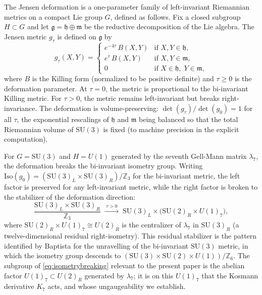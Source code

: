 \documentclass[12pt]{article}
\theoremstyle{definition}
\theoremstyle{remark}
\begin{document}
The Jensen deformation \cite{Jensen1973} is a one-parameter family of left-invariant Riemannian metrics on a compact Lie group $G$, defined as follows.  Fix a closed subgroup $H \subset G$ and let $\mathfrak{g} = \mathfrak{h} \oplus \mathfrak{m}$ be the reductive decomposition of the Lie algebra.  The Jensen metric $g_\tau$ is defined on $\mathfrak{g}$ by
\begin{equation}\label{eq:jensenmetric}
  g_\tau(X, Y) =
  \begin{cases}
    e^{-4\tau}\, B(X, Y) & \text{if } X, Y \in \mathfrak{h}, \\
    e^{\tau}\, B(X, Y) & \text{if } X, Y \in \mathfrak{m}, \\
    0 & \text{if } X \in \mathfrak{h},\; Y \in \mathfrak{m},
  \end{cases}
\end{equation}
where $B$ is the Killing form (normalized to be positive definite) and $\tau \geq 0$ is the deformation parameter.  At $\tau = 0$, the metric is proportional to the bi-invariant Killing metric.  For $\tau > 0$, the metric remains left-invariant but breaks right-invariance.  The deformation is volume-preserving: $\det(g_\tau) / \det(g_0) = 1$ for all $\tau$, the exponential rescalings of $\mathfrak{h}$ and $\mathfrak{m}$ being balanced so that the total Riemannian volume of $\mathrm{SU}(3)$ is fixed (to machine precision in the explicit computation).

For $G = \mathrm{SU}(3)$ and $H = U(1)$ generated by the seventh Gell-Mann matrix $\lambda_7$, the deformation breaks the bi-invariant isometry group.  Writing $\mathrm{Iso}(g_0) = (\mathrm{SU}(3)_L \times \mathrm{SU}(3)_R)/\mathbb{Z}_3$ for the bi-invariant metric, the left factor is preserved for any left-invariant metric, while the right factor is broken to the stabilizer of the deformation direction:
\begin{equation}\label{eq:isometrybreaking}
  \frac{\mathrm{SU}(3)_L \times \mathrm{SU}(3)_R}{\mathbb{Z}_3}
  \;\xrightarrow{\;\tau > 0\;}\;
  \mathrm{SU}(3)_L \times \big(\mathrm{SU}(2)_R \times U(1)_7\big),
\end{equation}
where $\mathrm{SU}(2)_R \times U(1)_7 \cong U(2)_R$ is the centralizer of $\lambda_7$ in $\mathrm{SU}(3)_R$ (a twelve-dimensional residual right-isometry).  This residual stabilizer is the pattern identified by Baptista \cite{Baptista2024KK} for the unravelling of the bi-invariant $\mathrm{SU}(3)$ metric, in which the isometry group descends to $(\mathrm{SU}(3) \times \mathrm{SU}(2) \times U(1))/\mathbb{Z}_6$.  The subgroup of \eqref{eq:isometrybreaking} relevant to the present paper is the abelian factor $U(1)_7 \subset U(2)_R$ generated by $\lambda_7$; it is on this $U(1)_7$ that the Kosmann derivative $K_7$ acts, and whose ungaugeability we establish.
\end{document}

